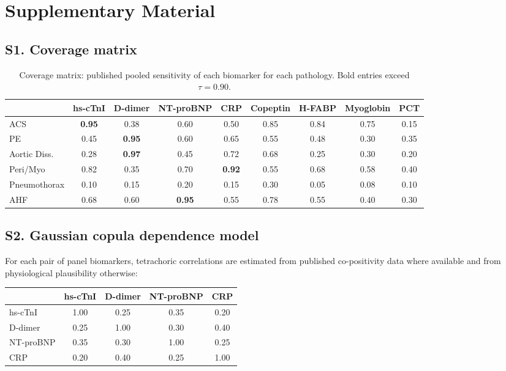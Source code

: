 \documentclass[11pt, oneside]{article}
\begin{document}
\newpage
\onecolumn

\section*{Supplementary Material}

\subsection*{S1. Coverage matrix}

\begin{table}[h]
\centering
\caption{Coverage matrix: published pooled sensitivity of each biomarker for each pathology. Bold entries exceed $\tau = 0.90$.}
\label{tab:coverage_full}
\scriptsize
\setlength{\tabcolsep}{4pt}
\begin{tabular}{@{}lcccccccc@{}}
\toprule
 & hs-cTnI & D-dimer & NT-proBNP & CRP & Copeptin & H-FABP & Myoglobin & PCT \\
\midrule
ACS           & \textbf{0.95} & 0.38 & 0.60 & 0.50 & 0.85 & 0.84 & 0.75 & 0.15 \\
PE            & 0.45 & \textbf{0.95} & 0.60 & 0.65 & 0.55 & 0.48 & 0.30 & 0.35 \\
Aortic Diss.  & 0.28 & \textbf{0.97} & 0.45 & 0.72 & 0.68 & 0.25 & 0.30 & 0.20 \\
Peri/Myo      & 0.82 & 0.35 & 0.70 & \textbf{0.92} & 0.55 & 0.68 & 0.58 & 0.40 \\
Pneumothorax  & 0.10 & 0.15 & 0.20 & 0.15 & 0.30 & 0.05 & 0.08 & 0.10 \\
AHF           & 0.68 & 0.60 & \textbf{0.95} & 0.55 & 0.78 & 0.55 & 0.40 & 0.30 \\
\bottomrule
\end{tabular}
\end{table}

\subsection*{S2. Gaussian copula dependence model}

For each pair of panel biomarkers, tetrachoric correlations are estimated from published co-positivity data where available and from physiological plausibility otherwise:

\begin{center}
\scriptsize
\begin{tabular}{@{}lcccc@{}}
\toprule
 & hs-cTnI & D-dimer & NT-proBNP & CRP \\
\midrule
hs-cTnI   & 1.00 & 0.25 & 0.35 & 0.20 \\
D-dimer   & 0.25 & 1.00 & 0.30 & 0.40 \\
NT-proBNP & 0.35 & 0.30 & 1.00 & 0.25 \\
CRP       & 0.20 & 0.40 & 0.25 & 1.00 \\
\bottomrule
\end{tabular}
\end{center}
\end{document}

